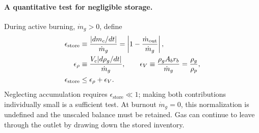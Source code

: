 \paragraph{A quantitative test for negligible storage.}
During active burning, $\dot m_g>0$, define
\begin{align}
 \epsilon_{\mathrm{store}}
 &\equiv\frac{|dm_c/dt|}{\dot m_g}
  =\left|1-\frac{\dot m_{\mathrm{out}}}{\dot m_g}\right|,
  \label{eq:sb-storage-test}\\
 \epsilon_\rho
 &\equiv\frac{V_c|d\rho_g/dt|}{\dot m_g},\qquad
 \epsilon_V\equiv\frac{\rho_g A_b r_b}{\dot m_g}
  =\frac{\rho_g}{\rho_p},\notag\\
 \epsilon_{\mathrm{store}}&\le\epsilon_\rho+\epsilon_V.\notag
\end{align}
Neglecting accumulation requires $\epsilon_{\mathrm{store}}\ll1$;
making both contributions individually small is a sufficient test.
At burnout $\dot m_g=0$, this normalization is undefined and the
unscaled balance must be retained. Gas can continue to leave through
the outlet by drawing down the stored inventory.

